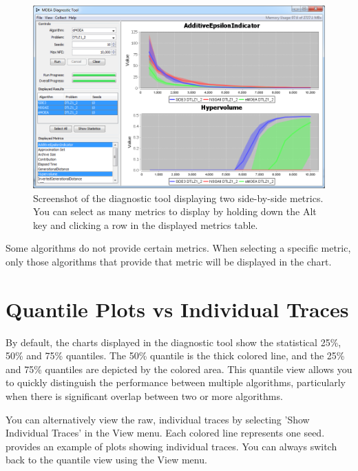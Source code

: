 \begin{figure}
  \includegraphics[width=\linewidth]{diagnosticToolMultiselect.png}
  \caption{Screenshot of the diagnostic tool displaying two side-by-side metrics.  You can select as many metrics to display by holding down the Alt key and clicking a row in the displayed metrics table.}
  \label{fig:diagnosticToolMultiselect}
\end{figure}

\begin{tip}
  Some algorithms do not provide certain metrics.  When selecting a specific metric, only those algorithms that provide that metric will be displayed in the chart.
\end{tip}

\section{Quantile Plots vs Individual Traces}
By default, the charts displayed in the diagnostic tool show the statistical 25\%, 50\% and 75\% quantiles.  The 50\% quantile is the thick colored line, and the 25\% and 75\% quantiles are depicted by the colored area.  This quantile view allows you to quickly distinguish the performance between multiple algorithms, particularly when there is significant overlap between two or more algorithms.

You can alternatively view the raw, individual traces by selecting 'Show Individual Traces' in the View menu.  Each colored line represents one seed.   provides an example of plots showing individual traces.  You can always switch back to the quantile view using the View menu.

